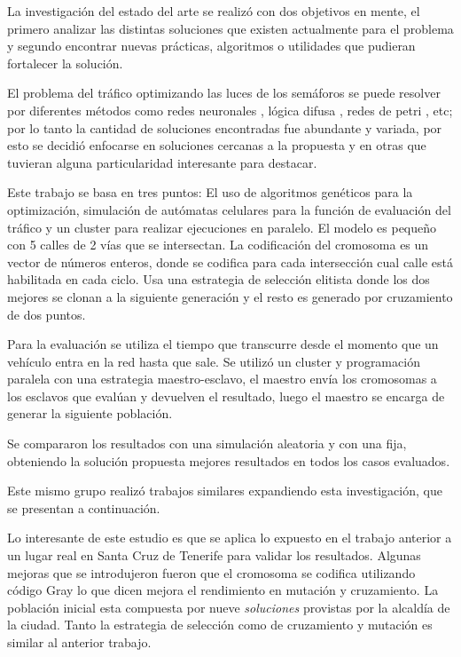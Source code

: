 La investigación del estado del arte se realizó con dos objetivos en mente, el primero analizar las distintas soluciones que existen actualmente para el problema y segundo encontrar nuevas prácticas, algoritmos o utilidades que pudieran fortalecer la solución.

El problema del tráfico optimizando las luces de los semáforos se puede resolver por diferentes métodos como  redes neuronales \citep{Lopez1999}, lógica difusa \citep{Lim2001}, redes de petri \citep{DiFebbraro2002}, etc; por lo tanto la cantidad de soluciones encontradas fue abundante y variada, por esto se decidió enfocarse en soluciones cercanas a la propuesta y en otras que tuvieran alguna particularidad interesante para destacar.


\begin{itemize}
	\begin{item}
		
		Este trabajo se basa en tres puntos: El uso de algoritmos genéticos para la optimización, simulación de autómatas celulares para la función de evaluación del tráfico y un cluster para realizar ejecuciones en paralelo.
		El modelo es pequeño con 5 calles de 2 vías que se intersectan.
		La codificación del cromosoma es un vector de números enteros, donde se codifica para cada intersección cual calle está habilitada en cada ciclo.
		Usa una estrategia de selección elitista donde los dos mejores se clonan a la siguiente generación y el resto es generado por cruzamiento de dos puntos.
		
		Para la evaluación se utiliza el tiempo que transcurre desde el momento que un vehículo entra en la red hasta que sale. Se utilizó un cluster y programación paralela con una estrategia maestro-esclavo, el maestro envía los cromosomas a los esclavos que evalúan y devuelven el resultado, luego el maestro se encarga de generar la siguiente población.
		
		Se compararon los resultados con una simulación aleatoria y con una fija, obteniendo la solución propuesta mejores resultados en todos los casos evaluados.
		
		Este mismo grupo realizó trabajos similares expandiendo esta investigación, que se presentan a continuación.
	\end{item}
	
	\begin{item}
		\bibentry{Sanchez2008}
		Lo interesante de este estudio es que se aplica lo expuesto en el trabajo anterior a un lugar real en Santa Cruz de Tenerife para validar los resultados.
		Algunas mejoras que se introdujeron fueron que el cromosoma se codifica utilizando código Gray lo que dicen mejora el rendimiento en mutación y cruzamiento. La población inicial esta compuesta por nueve \emph{soluciones} provistas por la alcaldía de la ciudad. Tanto la estrategia de selección como de cruzamiento y mutación es similar al anterior trabajo.
		

\end{item}
\end{itemize}
